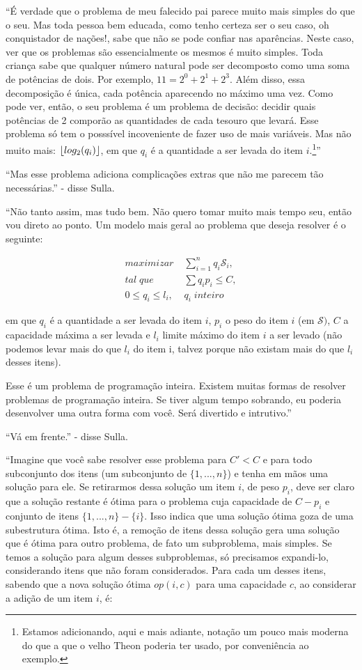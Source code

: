 ``É verdade que o problema de meu falecido pai parece muito mais
simples do que o seu. Mas toda pessoa bem educada, como tenho certeza
ser o seu caso, oh conquistador de nações!, sabe que não se pode
confiar nas aparências.  Neste caso, ver que os problemas são
essencialmente os mesmos é muito simples. Toda criança sabe que
qualquer número natural pode ser decomposto como uma soma de potências
de dois. Por exemplo, $11 = 2^0 + 2^1 + 2^3$. Além disso, essa
decomposição é única, cada potência aparecendo no máximo uma vez.
Como pode ver, então, o seu problema é um problema de decisão: decidir
quais potências de 2 comporão as quantidades de cada tesouro que
levará. Esse problema só tem o posssível incoveniente de fazer uso de
mais variáveis. Mas não muito mais: $\lfloor log_2(q_i)\rfloor$, em que $q_i$
é a quantidade a ser levada do item $i$.\footnote{Estamos adicionando,
  aqui e mais adiante, notação um pouco mais moderna do que a que o
  velho Theon poderia ter usado, por conveniência ao exemplo.}''

``Mas esse problema adiciona complicações extras que não me parecem
tão necessárias.'' - disse Sulla.

``Não tanto assim, mas tudo bem. Não quero tomar muito mais tempo seu,
então vou direto ao ponto. Um modelo mais geral ao problema que deseja
resolver é o seguinte:

\begin{align*}
  maximizar \;& \sum\limits_{i=1}^n q_i \mathscr{S}_i,\\ tal\; que\;&
  \sum{q_i p_i} \leq C,\\ 0 \leq q_i \leq l_i,\; & q_i \; inteiro
\end{align*}

\noindent em que $q_i$ é a quantidade a ser levada do item $i$, $p_i$
o peso do item $i$ (em $\mathscr{S})$, $C$ a capacidade máxima a ser
levada e $l_i$ limite máximo do item $i$ a ser levado (não podemos
levar mais do que $l_i$ do item i, talvez porque não existam mais do
que $l_i$ desses itens).

Esse é um problema de programação inteira. Existem muitas formas de
resolver problemas de programação inteira. Se tiver algum tempo
sobrando, eu poderia desenvolver uma outra forma com você. Será
divertido e intrutivo.''

``Vá em frente.'' - disse Sulla.

``Imagine que você sabe resolver esse problema para $C' < C$ e para
todo subconjunto dos itens (um subconjunto de $\{1, ..., n\}$) e tenha
em mãos uma solução para ele. Se retirarmos dessa solução um item $i$,
de peso $p_i$, deve ser claro que a solução restante é ótima para o
problema cuja capacidade de $C - p_i$ e conjunto de itens $\{1, ...,
n\}-\{i\}$. Isso indica que uma solução ótima goza de uma subestrutura
ótima. Isto é, a remoção de itens dessa solução gera uma solução que é
ótima para outro problema, de fato um subproblema, mais simples. Se
temos a solução para algum desses subproblemas, só precisamos
expandi-lo, considerando itens que não foram considerados. Para cada
um desses itens, sabendo que a nova solução ótima $op(i,c)$ para uma
capacidade $c$, ao considerar a adição de um item $i$, é:

